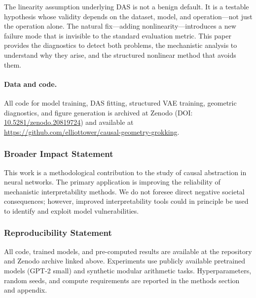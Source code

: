 \documentclass{article}
\begin{document}
The linearity assumption underlying DAS is not a benign default. It is a
testable hypothesis whose validity depends on the dataset, model, and
operation---not just the operation alone. The natural fix---adding
nonlinearity---introduces a new failure mode that is invisible to the
standard evaluation metric. This paper provides the diagnostics to detect
both problems, the mechanistic analysis to understand why they arise, and the
structured nonlinear method that avoids them.

\paragraph{Data and code.} All code for model training, DAS fitting, structured
VAE training, geometric diagnostics, and figure generation is archived at
Zenodo (DOI: \href{https://doi.org/10.5281/zenodo.20819724}{10.5281/zenodo.20819724})
and available at
\url{https://github.com/elliottower/causal-geometry-grokking}.

\subsubsection*{Broader Impact Statement}
This work is a methodological contribution to the study of causal abstraction
in neural networks. The primary application is improving the reliability of
mechanistic interpretability methods. We do not foresee direct negative
societal consequences; however, improved interpretability tools could in
principle be used to identify and exploit model vulnerabilities.

\subsubsection*{Reproducibility Statement}
All code, trained models, and pre-computed results are available at the
repository and Zenodo archive linked above. Experiments use publicly available
pretrained models (GPT-2 small) and synthetic modular arithmetic tasks.
Hyperparameters, random seeds, and compute requirements are reported in
the methods section and appendix.




\clearpage
\appendix

\end{document}
